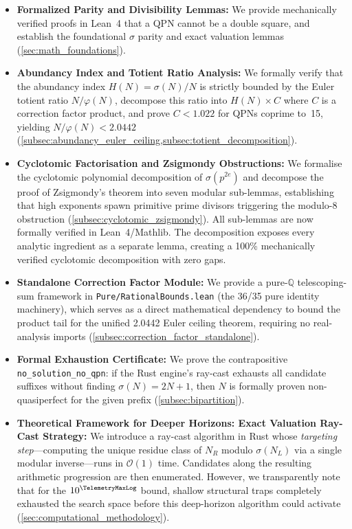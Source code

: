 \begin{itemize}
  \item \textbf{Formalized Parity and Divisibility Lemmas:}
    We provide mechanically verified proofs in Lean~4 that a QPN cannot
    be a double square, and establish the foundational $\sigma$ parity
    and exact valuation lemmas (\cref{sec:math_foundations}).

  \item \textbf{Abundancy Index and Totient Ratio Analysis:}
    We formally verify that the abundancy index
    $H(N) = \sigma(N)/N$ is strictly bounded by the Euler totient ratio
    $N/\varphi(N)$, decompose this ratio into $H(N) \times C$ where $C$
    is a correction factor product, and prove $C < 1.022$ for QPNs
    coprime to~15, yielding $N/\varphi(N) < 2.0442$
    (\cref{subsec:abundancy_euler_ceiling,subsec:totient_decomposition}).

  \item \textbf{Cyclotomic Factorisation and Zsigmondy Obstructions:}
    We formalise the cyclotomic polynomial decomposition of
    $\sigma(p^{2e})$ and decompose the proof of Zsigmondy's theorem
    into seven modular sub-lemmas, establishing
    that high exponents spawn primitive prime divisors triggering the
    modulo-8 obstruction (\cref{subsec:cyclotomic_zsigmondy}).
    All sub-lemmas are now formally verified in Lean~4/Mathlib.
    The decomposition exposes every analytic ingredient
    as a separate lemma, creating a 100\% mechanically verified
    cyclotomic decomposition with zero gaps.

  \item \textbf{Standalone Correction Factor Module:}
    We provide a pure-$\mathbb{Q}$ telescoping-sum framework in
    \texttt{Pure/RationalBounds.lean} (the 36/35 pure identity machinery), 
    which serves as a direct mathematical dependency to bound the product 
    tail for the unified 2.0442 Euler ceiling theorem, requiring no real-analysis imports
    (\cref{subsec:correction_factor_standalone}).

  \item \textbf{Formal Exhaustion Certificate:}
    We prove the contrapositive
    \texttt{no\_\allowbreak{}solution\_\allowbreak{}no\_\allowbreak{}qpn}:
    if the Rust engine's ray-cast exhausts all candidate suffixes
    without finding $\sigma(N)=2N+1$, then $N$ is formally proven
    non-quasiperfect for the given prefix
    (\cref{subsec:bipartition}).

  \item \textbf{Theoretical Framework for Deeper Horizons: Exact Valuation Ray-Cast Strategy:}
    We introduce a ray-cast algorithm in Rust whose \emph{targeting
    step}---computing the unique residue class of $N_R$ modulo
    $\sigma(N_L)$ via a single modular inverse---runs in
    $\mathcal{O}(1)$ time. Candidates along the resulting arithmetic
    progression are then enumerated. However, we transparently note that for the
    $10^{\TelemetryMaxLog}$ bound, shallow structural traps completely exhausted the
    search space before this deep-horizon algorithm could activate
    (\cref{sec:computational_methodology}).


\end{itemize}
